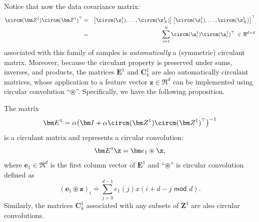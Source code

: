 \documentclass[../../book-main.tex]{subfiles}
\begin{document}
Notice that now the data covariance matrix:
\begin{eqnarray}
    \circm(\bm Z^1) \circm(\bm Z^1)^\top
    &=& \left[ \circm(\z_{1}^1), \dots, \circm(\z_{N}^1) \right]
    \left[ \circm(\z_{1}^1), \dots, \circm (\z_{N}^1) \right]^\top \nonumber \\
    &=& \sum_{i =1}^N \circm(\z_{i}^1) \circm(\z_{i}^1)^\top \;\in
    \Re^{d\times d}
\end{eqnarray}
associated with this family of samples is {\em automatically} a
(symmetric) circulant matrix. Moreover, because the circulant
property is preserved under sums, inverses, and products, the
matrices $\bm E^1$ and $\bm C^1_k$ are also automatically circulant
matrices, whose application to a feature vector $\bm z \in \Re^d$ can
be implemented using circular convolution ``$\circledast$''.
Specifically, we have the following proposition.

\begin{proposition}
    The matrix
    \begin{equation}
        \bm E^1 = \alpha\big(\bm I + \alpha \circm(\bm Z^1)
        \circm(\bm Z^1)^\top \big)^{-1}
    \end{equation}
    is a circulant matrix and represents a circular convolution:
    $$\bm E^1 \z = \bm e_1 \circledast \z,$$
    where $\bm e_1 \in \Re^d$ is the first column vector of $\bm E^1$
    and ``$\circledast$'' is circular convolution defined as
    \begin{equation*}
        (\bm e_1 \circledast \bm z)_{i} \doteq \sum_{j=0}^{d-1}
        e_1(j) x(i+ d-j \,\, \textsf{mod} \,\,d).
    \end{equation*}
    Similarly, the matrices $\bm C^1_k$ associated with any subsets
    of $\bm Z^1$ are also circular convolutions.
    \label{prop:circular-conv-1}
\end{proposition}
\end{document}
